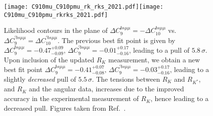 \documentclass[a4paper,11pt]{article}
\def\rk{R_{K}}
\def\rks{R_{K^\ast}}
\begin{document}
% 
\begin{figure}[h!]
    \centering
    \texttt{[image: C910mu\_C910pmu\_rk\_rks\_2021.pdf]}\texttt{[image: C910mu\_C910pmu\_rkrks\_2021.pdf]}
    \caption{Likelihood contours in the plane of $\Delta C_9^{bs\mu\mu} = -\Delta C_{10}^{bs\mu\mu}$ vs. $\Delta C_{9}^{\prime bs\mu\mu} = \Delta C_{10}^{\prime bs\mu\mu}$. The previous best fit point is given by $\Delta C_9^{bs\mu\mu} = -0.47^{+0.09}_{-0.09},\,\Delta C_{9}^{\prime bs\mu\mu} = -0.01^{+0.17}_{-0.16}$, leading to a pull of $5.8\,\sigma$. Upon inclusion of the updated $\rk$ measurement, we obtain a new best fit point  $\Delta C_9^{bs\mu\mu} =  -0.41^{+0.07}_{-0.08},\,\Delta C_{9}^{\prime bs\mu\mu} = -0.03^{+0.17}_{-0.16}$, leading to a slightly {\it decreased} pull of $5.5\,\sigma$. The tensions between $\rk$ and $\rks$, and $\rk$ and the angular data, increases due to the improved accuracy in the experimental measurement of $\rk$, hence leading to a decreased pull. Figures taken from Ref.~\cite{talk}.}
    \label{fig:C910mu_C910pmu}
\end{figure}
\end{document}

